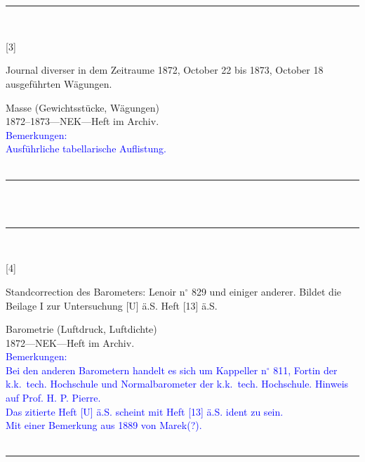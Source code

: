 \\
\vspace*{-2.5pt}\\
\parbox{\textwidth}{%
\rule{\textwidth}{1pt}\vspace*{-3mm}\\
\begin{minipage}[t]{0.1\textwidth}\vspace{0pt}
\Huge\rule[-4mm]{0cm}{1cm}[3]
\end{minipage}
\hfill
\begin{minipage}[t]{0.9\textwidth}\vspace{0pt}
\large Journal diverser in dem Zeitraume 1872, October 22 bis 1873, October 18 ausgeführten Wägungen.\rule[-2mm]{0mm}{2mm}
\end{minipage}
{\footnotesize\flushright
Masse (Gewichtsstücke, Wägungen)\\
}
1872--1873\quad---\quad NEK\quad---\quad Heft im Archiv.\\
\textcolor{blue}{Bemerkungen:\\{}
Ausführliche tabellarische Auflistung.\\{}
}
\\[-15pt]
\rule{\textwidth}{1pt}
}
\\
\vspace*{-2.5pt}\\
\parbox{\textwidth}{%
\rule{\textwidth}{1pt}\vspace*{-3mm}\\
\begin{minipage}[t]{0.1\textwidth}\vspace{0pt}
\Huge\rule[-4mm]{0cm}{1cm}[4]
\end{minipage}
\hfill
\begin{minipage}[t]{0.9\textwidth}\vspace{0pt}
\large Standcorrection des Barometers: Lenoir n{$^\circ$} 829 und einiger anderer. Bildet die Beilage I zur Untersuchung [U] ä.S. Heft [13] ä.S.\rule[-2mm]{0mm}{2mm}
\end{minipage}
{\footnotesize\flushright
Barometrie (Luftdruck, Luftdichte)\\
}
1872\quad---\quad NEK\quad---\quad Heft im Archiv.\\
\textcolor{blue}{Bemerkungen:\\{}
Bei den anderen Barometern handelt es sich um Kappeller n{$^\circ$} 811, Fortin der k.k.\ tech. Hochschule und Normalbarometer der k.k.\ tech. Hochschule. Hinweis auf Prof. H. P. Pierre.\\{}
Das zitierte Heft [U] ä.S. scheint mit Heft [13] ä.S. ident zu sein.\\{}
Mit einer Bemerkung aus 1889 von Marek(?).\\{}
}
\\[-15pt]
\rule{\textwidth}{1pt}
}
